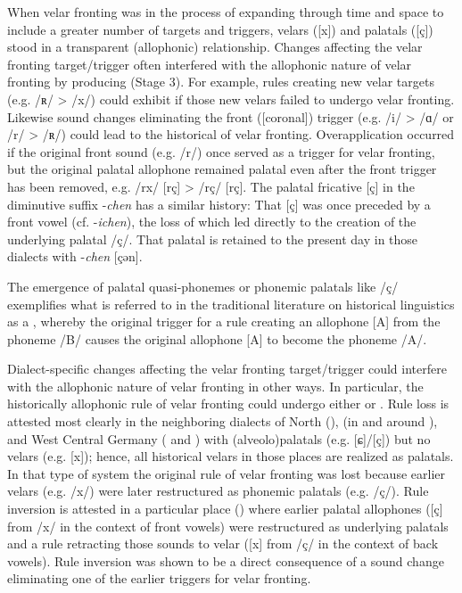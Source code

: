 When velar fronting was in the process of expanding through time and space to include a greater number of targets and triggers, velars ([x]) and palatals ([ç]) stood in a transparent (allophonic) relationship. Changes affecting the velar fronting target/trigger often interfered with the allophonic nature of velar fronting by producing  (Stage 3). For example, rules creating new velar targets (e.g. /ʀ/ > /x/) could exhibit  if those new velars failed to undergo velar fronting. Likewise sound changes eliminating the front ([coronal]) trigger (e.g. /i/ > /ɑ/ or /r/ > /ʀ/) could lead to the historical  of velar fronting. Overapplication occurred if the original front sound (e.g. /r/) once served as a trigger for velar fronting, but the original palatal allophone remained palatal even after the front trigger has been removed, e.g. /rx/ [rç] > /rç/ [rç]. The palatal fricative [ç] in the diminutive suffix -\textit{chen} has a similar history: That [ç] was once preceded by a front vowel (cf.  -\textit{ichen}), the loss of which led directly to the creation of the underlying palatal /ç/. That palatal is retained to the present day in those dialects with -\textit{chen} [çən].

The emergence of palatal quasi-phonemes or phonemic palatals like /ç/ exemplifies what is referred to in the traditional literature on historical linguistics as a , whereby the original trigger for a rule creating an allophone [A] from the phoneme /B/ causes the original allophone [A] to become the phoneme /A/.

Dialect-specific changes affecting the velar fronting target/trigger could interfere with the allophonic nature of velar fronting in other ways. In particular, the historically allophonic rule of velar fronting could undergo either  or . Rule loss is attested most clearly in the neighboring dialects of North  (),  (in and around ), and West Central Germany ( and ) with (alveolo)palatals (e.g. [ɕ]/[ç]) but no velars (e.g. [x]); hence, all historical velars in those places are realized as palatals. In that type of system the original rule of velar fronting was lost because earlier velars (e.g. /x/) were later restructured as phonemic palatals (e.g. /ç/). Rule inversion is attested in a particular place () where earlier palatal allophones ([ç] from /x/ in the context of front vowels) were restructured as underlying palatals and a rule retracting those sounds to velar ([x] from /ç/ in the context of back vowels). Rule inversion was shown to be a direct consequence of a sound change eliminating one of the earlier triggers for velar fronting.

